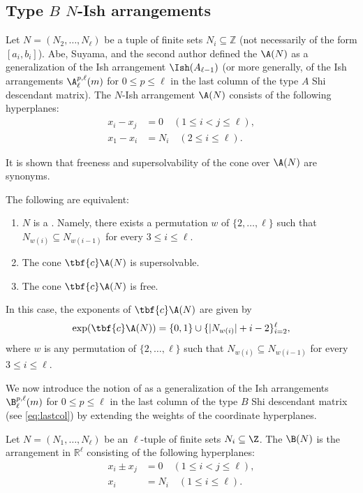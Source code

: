 \subsection{Type \texorpdfstring{$B$}{B} \texorpdfstring{$N$}{N}-Ish arrangements}
\label{subsec:BN-Ish}
Let $N = (N_{2}, \dots, N_{\ell})$ be a tuple of finite sets $N_{i} \subseteq \mathbb{Z}$ (not necessarily of the form $[a_i,b_i]$). 
Abe, Suyama, and the second author \cite{AST17} defined the  $\A(N)$ as a generalization of the Ish arrangement $\Ish(A_{\ell-1}) $ (or more generally, of the Ish arrangements $  \A^{p,\ell}_\ell(m)$ for $0 \le p \le \ell$ in the last column of the type $A$ Shi descendant matrix).
The $N$-Ish arrangement $\A(N)$ consists of the following hyperplanes: 
\begin{align*}
x_{i}-x_{j} &= 0 \quad (1 \leq i < j \leq \ell), \\
x_{1}-x_{i} &= N_{i} \quad (2 \leq i \leq \ell).  
\end{align*}

It is shown that freeness and supersolvability of the cone over $\A(N)$ are synonyms. 

\begin{theorem}\label{thm:AN-Ish}
The following are equivalent: 
\begin{enumerate}[(1)]
\item $N$ is a . 
Namely, there exists a permutation $w$ of $\{2, \dots, \ell\}$ such that $N_{w(i)} \subseteq N_{w(i-1)}$ for every $3 \le  i \leq \ell$. 
\item  The cone $\tbf{c}\A(N)$ is supersolvable.
\item The cone $\tbf{c}\A(N)$  is  free.
\end{enumerate}
In this case, the exponents of  $\tbf{c}\A(N)$ are given by 
$$\exp(\tbf{c}\A(N)) = \{0,1\} \cup \{| N_{w(i)}| + i-2\}_{i=2}^\ell,$$ 
where  $w$ is any permutation of $\{2, \dots, \ell\}$ such that $N_{w(i)} \subseteq N_{w(i-1)}$ for every $3 \le  i \leq \ell$.
\end{theorem}

We now introduce the notion of  as a generalization of the Ish arrangements $  \B^{p,\ell}_\ell(m)$ for $0 \le p \le \ell$ in the last column of the type $B$ Shi descendant matrix (see \eqref{eq:lastcol}) by extending the weights of the coordinate hyperplanes.
\begin{definition}
\label{def:N-Ish-B}
Let $N = (N_1, \ldots, N_\ell)$ be an $\ell$-tuple of finite sets $N_i\subseteq\Z$. 
The   $\B(N)$ is the arrangement  in $ \mathbb{R}^{\ell} $
consisting of the following hyperplanes:
\begin{align*}
x_{i}\pm x_{j} &= 0\quad  (1 \leq i < j \leq \ell), \\
x_i&=  N_i \quad (1 \le  i \leq \ell).
\end{align*}
\end{definition}

